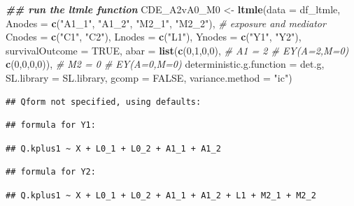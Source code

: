 \documentclass[
]{book}
\newenvironment{Shaded}{\begin{snugshade}}{\end{snugshade}}
\newcommand{\AttributeTok}[1]{\textcolor[rgb]{0.13,0.29,0.53}{#1}}
\newcommand{\CommentTok}[1]{\textcolor[rgb]{0.56,0.35,0.01}{\textit{#1}}}
\newcommand{\ConstantTok}[1]{\textcolor[rgb]{0.56,0.35,0.01}{#1}}
\newcommand{\DecValTok}[1]{\textcolor[rgb]{0.00,0.00,0.81}{#1}}
\newcommand{\DocumentationTok}[1]{\textcolor[rgb]{0.56,0.35,0.01}{\textbf{\textit{#1}}}}
\newcommand{\FunctionTok}[1]{\textcolor[rgb]{0.13,0.29,0.53}{\textbf{#1}}}
\newcommand{\NormalTok}[1]{#1}
\newcommand{\OtherTok}[1]{\textcolor[rgb]{0.56,0.35,0.01}{#1}}
\newcommand{\StringTok}[1]{\textcolor[rgb]{0.31,0.60,0.02}{#1}}
\begin{document}
\begin{Shaded}
\begin{Highlighting}[]
\DocumentationTok{\#\# run the ltmle function}
\NormalTok{CDE\_A2vA0\_M0 }\OtherTok{\textless{}{-}} \FunctionTok{ltmle}\NormalTok{(}\AttributeTok{data =}\NormalTok{ df\_ltmle,}
                \AttributeTok{Anodes =} \FunctionTok{c}\NormalTok{(}\StringTok{"A1\_1"}\NormalTok{, }\StringTok{"A1\_2"}\NormalTok{, }\StringTok{"M2\_1"}\NormalTok{, }\StringTok{"M2\_2"}\NormalTok{), }\CommentTok{\# exposure and mediator}
                \AttributeTok{Cnodes =} \FunctionTok{c}\NormalTok{(}\StringTok{"C1"}\NormalTok{, }\StringTok{"C2"}\NormalTok{),}
                \AttributeTok{Lnodes =} \FunctionTok{c}\NormalTok{(}\StringTok{"L1"}\NormalTok{),}
                \AttributeTok{Ynodes =} \FunctionTok{c}\NormalTok{(}\StringTok{"Y1"}\NormalTok{, }\StringTok{"Y2"}\NormalTok{),}
                \AttributeTok{survivalOutcome =} \ConstantTok{TRUE}\NormalTok{,}
                \AttributeTok{abar =} \FunctionTok{list}\NormalTok{(}\FunctionTok{c}\NormalTok{(}\DecValTok{0}\NormalTok{,}\DecValTok{1}\NormalTok{,}\DecValTok{0}\NormalTok{,}\DecValTok{0}\NormalTok{), }\CommentTok{\# A1 = 2 \# EY(A=2,M=0)}
                            \FunctionTok{c}\NormalTok{(}\DecValTok{0}\NormalTok{,}\DecValTok{0}\NormalTok{,}\DecValTok{0}\NormalTok{,}\DecValTok{0}\NormalTok{)), }\CommentTok{\# M2 = 0 \# EY(A=0,M=0)}
                \AttributeTok{deterministic.g.function =}\NormalTok{ det.g,}
                \AttributeTok{SL.library =}\NormalTok{ SL.library,}
                \AttributeTok{gcomp =} \ConstantTok{FALSE}\NormalTok{,}
                \AttributeTok{variance.method =} \StringTok{"ic"}\NormalTok{)}
\end{Highlighting}
\end{Shaded}

\begin{verbatim}
## Qform not specified, using defaults:
\end{verbatim}

\begin{verbatim}
## formula for Y1:
\end{verbatim}

\begin{verbatim}
## Q.kplus1 ~ X + L0_1 + L0_2 + A1_1 + A1_2
\end{verbatim}

\begin{verbatim}
## formula for Y2:
\end{verbatim}

\begin{verbatim}
## Q.kplus1 ~ X + L0_1 + L0_2 + A1_1 + A1_2 + L1 + M2_1 + M2_2
\end{verbatim}
\end{document}
